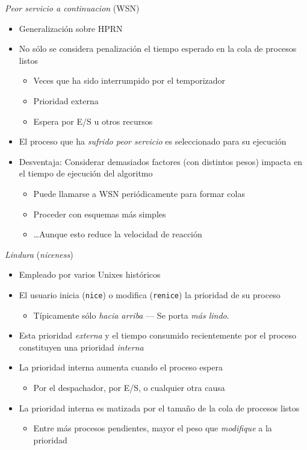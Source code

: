 \documentclass[presentation]{beamer}
\begin{document}
\begin{frame}[label={sec:orgd352f2e}]{\emph{Peor servicio a continuacion} (WSN)}
\begin{itemize}
\item Generalización sobre HPRN
\item No sólo se considera penalización el tiempo esperado en la cola de
procesos listos
\begin{itemize}
\item Veces que ha sido interrumpido por el temporizador
\item Prioridad externa
\item Espera por E/S u otros recursos
\end{itemize}
\item El proceso que ha \emph{sufrido peor servicio} es seleccionado para su
ejecución
\item Desventaja: Considerar demasiados factores (con distintos pesos)
impacta en el tiempo de ejecución del algoritmo
\begin{itemize}
\item Puede llamarse a WSN periódicamente para formar colas
\item Proceder con esquemas más simples
\item \ldots{}Aunque esto reduce la velocidad de reacción
\end{itemize}
\end{itemize}
\end{frame}

\begin{frame}[label={sec:orgae282d6},fragile]{\emph{Lindura} (\emph{niceness})}
 \begin{itemize}
\item Empleado por varios Unixes históricos
\item El usuario inicia (\texttt{nice}) o modifica (\texttt{renice}) la prioridad de su
proceso
\begin{itemize}
\item Típicamente sólo \emph{hacia arriba} — Se porta \emph{más lindo}.
\end{itemize}
\item Esta prioridad \emph{externa} y el tiempo consumido recientemente por el
proceso constituyen una prioridad \emph{interna}
\item La prioridad interna aumenta cuando el proceso espera
\begin{itemize}
\item Por el despachador, por E/S, o cualquier otra causa
\end{itemize}
\item La prioridad interna es matizada por el tamaño de la cola de
procesos listos
\begin{itemize}
\item Entre más procesos pendientes, mayor el peso que \emph{modifique} a la
prioridad
\end{itemize}
\end{itemize}
\end{frame}
\end{document}
